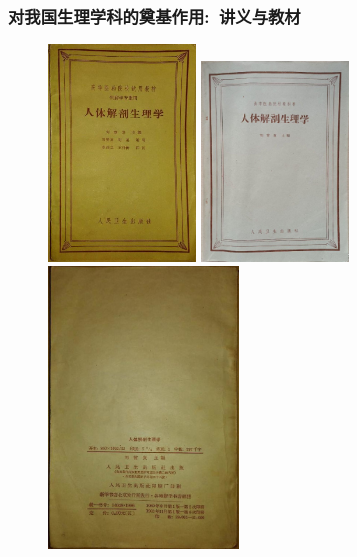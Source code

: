 \frame
{
	\frametitle{对我国生理学科的奠基作用:~讲义与教材}
\begin{figure}[h!] 
\centering
\vspace{-0.05in}
\includegraphics[height=0.48\textwidth,width=0.35\textwidth,clip]{Figures_Peking-Opera/Liu-Anatomy_and_Physiology-5.jpg}
\includegraphics[height=0.48\textwidth,width=0.35\textwidth,clip]{Figures_Peking-Opera/Liu-Anatomy_and_Physiology-7.jpg}
\includegraphics[height=0.22\textwidth,width=0.45\textwidth,viewport=0 70 548 330,clip]{Figures_Peking-Opera/Liu-Anatomy_and_Physiology-6.jpg}
\label{Liu-Anatomy_and_Physiology-college}
\end{figure}
}

